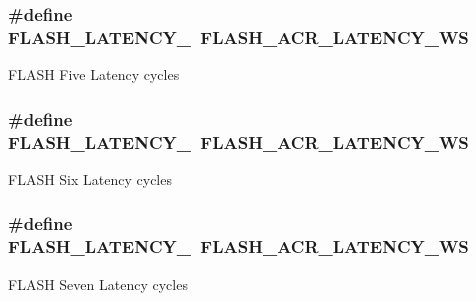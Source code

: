 \subsubsection[{\texorpdfstring{F\+L\+A\+S\+H\+\_\+\+L\+A\+T\+E\+N\+C\+Y\+\_\+5}{FLASH_LATENCY_5}}]{\setlength{\rightskip}{0pt plus 5cm}\#define F\+L\+A\+S\+H\+\_\+\+L\+A\+T\+E\+N\+C\+Y\+\_~F\+L\+A\+S\+H\+\_\+\+A\+C\+R\+\_\+\+L\+A\+T\+E\+N\+C\+Y\+\_\+WS}\hypertarget{group___f_l_a_s_h___latency_ga2517d62fa71e27b3b53223bbaacd06f7}{}\label{group___f_l_a_s_h___latency_ga2517d62fa71e27b3b53223bbaacd06f7}
F\+L\+A\+SH Five Latency cycles 
\subsubsection[{\texorpdfstring{F\+L\+A\+S\+H\+\_\+\+L\+A\+T\+E\+N\+C\+Y\+\_\+6}{FLASH_LATENCY_6}}]{\setlength{\rightskip}{0pt plus 5cm}\#define F\+L\+A\+S\+H\+\_\+\+L\+A\+T\+E\+N\+C\+Y\+\_~F\+L\+A\+S\+H\+\_\+\+A\+C\+R\+\_\+\+L\+A\+T\+E\+N\+C\+Y\+\_\+WS}\hypertarget{group___f_l_a_s_h___latency_gad047485b4941997af3c55ad61ad9c13a}{}\label{group___f_l_a_s_h___latency_gad047485b4941997af3c55ad61ad9c13a}
F\+L\+A\+SH Six Latency cycles 
\subsubsection[{\texorpdfstring{F\+L\+A\+S\+H\+\_\+\+L\+A\+T\+E\+N\+C\+Y\+\_\+7}{FLASH_LATENCY_7}}]{\setlength{\rightskip}{0pt plus 5cm}\#define F\+L\+A\+S\+H\+\_\+\+L\+A\+T\+E\+N\+C\+Y\+\_~F\+L\+A\+S\+H\+\_\+\+A\+C\+R\+\_\+\+L\+A\+T\+E\+N\+C\+Y\+\_\+WS}\hypertarget{group___f_l_a_s_h___latency_ga09e9f01dd2e6e361adc9c995a5a73510}{}\label{group___f_l_a_s_h___latency_ga09e9f01dd2e6e361adc9c995a5a73510}
F\+L\+A\+SH Seven Latency cycles 